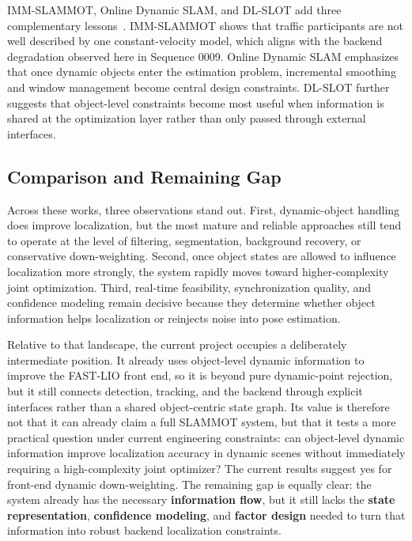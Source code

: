 \documentclass[a4paper,12pt]{article}
\begin{document}
IMM-SLAMMOT, Online Dynamic SLAM, and DL-SLOT add three complementary lessons~\cite{imm-slammot,online-dynamic-slam,dl-slot}. IMM-SLAMMOT shows that traffic participants are not well described by one constant-velocity model, which aligns with the backend degradation observed here in Sequence 0009. Online Dynamic SLAM emphasizes that once dynamic objects enter the estimation problem, incremental smoothing and window management become central design constraints. DL-SLOT further suggests that object-level constraints become most useful when information is shared at the optimization layer rather than only passed through external interfaces.

\subsection{Comparison and Remaining Gap}
Across these works, three observations stand out. First, dynamic-object handling does improve localization, but the most mature and reliable approaches still tend to operate at the level of filtering, segmentation, background recovery, or conservative down-weighting. Second, once object states are allowed to influence localization more strongly, the system rapidly moves toward higher-complexity joint optimization. Third, real-time feasibility, synchronization quality, and confidence modeling remain decisive because they determine whether object information helps localization or reinjects noise into pose estimation.

Relative to that landscape, the current project occupies a deliberately intermediate position. It already uses object-level dynamic information to improve the FAST-LIO front end, so it is beyond pure dynamic-point rejection, but it still connects detection, tracking, and the backend through explicit interfaces rather than a shared object-centric state graph. Its value is therefore not that it can already claim a full SLAMMOT system, but that it tests a more practical question under current engineering constraints: can object-level dynamic information improve localization accuracy in dynamic scenes without immediately requiring a high-complexity joint optimizer? The current results suggest yes for front-end dynamic down-weighting. The remaining gap is equally clear: the system already has the necessary \textbf{information flow}, but it still lacks the \textbf{state representation}, \textbf{confidence modeling}, and \textbf{factor design} needed to turn that information into robust backend localization constraints.
\end{document}
